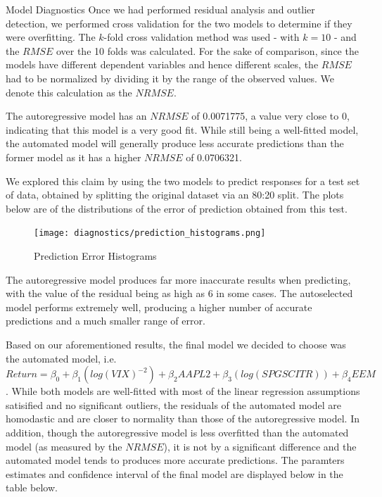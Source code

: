 \documentclass[]{article}
\begin{document}
\begin{section}{Model Diagnostics}
Once we had performed residual analysis and outlier detection, we performed cross validation for the two models to determine if they were overfitting. The $k$-fold cross validation method was used - with $k=10$ - and the $RMSE$ over the 10 folds was calculated. For the sake of comparison, since the models have different dependent variables and hence different scales, the $RMSE$ had to be normalized by dividing it by the range of the observed values. We denote this calculation as the $NRMSE$. 

The autoregressive model has an $NRMSE$ of 0.0071775, a value very close to 0, indicating that this model is a very good fit. While still being a well-fitted model, the automated model will generally produce less accurate predictions than the former model as it has a higher $NRMSE$ of 0.0706321.

We explored this claim by using the two models to predict responses for a test set of data, obtained by splitting the original dataset via an 80:20 split. The plots below are of the distributions of the error of prediction obtained from this test.

\begin{figure}[h]
  \centering
  \texttt{[image: diagnostics/prediction\_histograms.png]}
  \captionsetup{labelformat=empty}
  \caption{Prediction Error Histograms}
\end{figure}

The autoregressive model produces far more inaccurate results when predicting, with the value of the residual being as high as 6 in some cases. The autoselected model performs extremely well, producing a higher number of accurate predictions and a much smaller range of error.

Based on our aforementioned results, the final model we decided to choose was the automated model, i.e. $ Return = \beta_0 + \beta_1(log(VIX)^{-2}) + \beta_2AAPL2 + \beta_3(log(SPGSCITR)) + \beta_4EEM$. While both models are well-fitted with most of the linear regression assumptions satisified and no significant outliers, the residuals of the automated model are homodastic and are closer to normality than those of the autoregressive model. In addition, though the autoregressive model is less overfitted than the automated model (as measured by the $NRMSE$), it is not by a significant difference and the automated model tends to produces more accurate predictions. The paramters estimates and confidence interval of the final model are displayed below in the table below.


\end{section}
\end{document}
